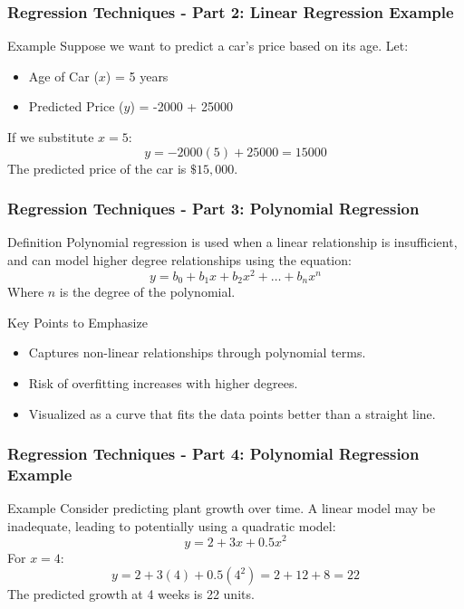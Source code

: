 \documentclass[aspectratio=169]{beamer}
\begin{document}
\begin{frame}[fragile]
    \frametitle{Regression Techniques - Part 2: Linear Regression Example}
    \begin{block}{Example}
        Suppose we want to predict a car's price based on its age. 
        Let:
        \begin{itemize}
            \item Age of Car (\(x\)) = 5 years
            \item Predicted Price (\(y\)) = -2000 \cdot {} + 25000
        \end{itemize}
        If we substitute \(x = 5\):
        \begin{equation}
            y = -2000(5) + 25000 = 15000
        \end{equation}
        The predicted price of the car is \(\$15,000\).
    \end{block}
\end{frame}

\begin{frame}[fragile]
    \frametitle{Regression Techniques - Part 3: Polynomial Regression}
    \begin{block}{Definition}
        Polynomial regression is used when a linear relationship is insufficient, and can model higher degree relationships using the equation:
        \begin{equation}
            y = b_0 + b_1x + b_2x^2 + \ldots + b_nx^n
        \end{equation}
        Where \(n\) is the degree of the polynomial.
    \end{block}

    \begin{block}{Key Points to Emphasize}
        \begin{itemize}
            \item Captures non-linear relationships through polynomial terms.
            \item Risk of overfitting increases with higher degrees.
            \item Visualized as a curve that fits the data points better than a straight line.
        \end{itemize}
    \end{block}
\end{frame}

\begin{frame}[fragile]
    \frametitle{Regression Techniques - Part 4: Polynomial Regression Example}
    \begin{block}{Example}
        Consider predicting plant growth over time. A linear model may be inadequate, leading to potentially using a quadratic model:
        \begin{equation}
            y = 2 + 3x + 0.5x^2
        \end{equation}
        For \(x = 4\):
        \begin{equation}
            y = 2 + 3(4) + 0.5(4^2) = 2 + 12 + 8 = 22
        \end{equation}
        The predicted growth at 4 weeks is 22 units.
    \end{block}
\end{frame}
\end{document}
